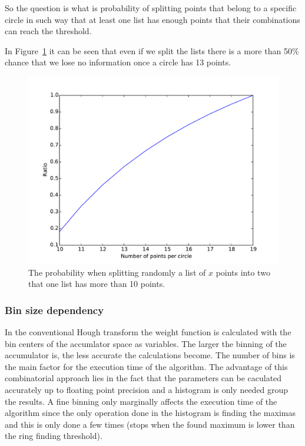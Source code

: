 \documentclass[11pt]{scrreprt}
\begin{document}
So the question is what is probability of splitting points that belong to a specific circle in such way that at least one list
has enough points that their combinations can reach the threshold.

In Figure~\ref{fig:ratios} it can be seen that even if we split the lists there is a more 
than 50\% chance that we lose no information once a circle has 13 points.
\begin{figure}[htb]
  \centering
  \includegraphics[width=\textwidth]{pics/ratio.pdf}
  \caption{The probability when splitting randomly a list of $x$ points into two that one list has more than 10 points.}
  \label{fig:ratios}
\end{figure}

\subsubsection{Bin size dependency} %
\label{ssub:bin_size_dependency}
In the conventional Hough transform the weight function is calculated with the
bin centers of the accumlator space as variables. The larger the binning of the accumulator is, the less accurate the calculations become. 
The number of bins is the main factor for the execution time of the algorithm. The advantage of this combinatorial approach lies in the 
fact that the parameters can be caculated accurately up to floating point precision and a histogram is only needed group the results. 
A fine binning only marginally affects the execution time of the algorithm since the only operation done in the histogram is finding the 
maximas and this is only done a few times (stops when the found maximum is lower than the ring finding threshold).
\end{document}
